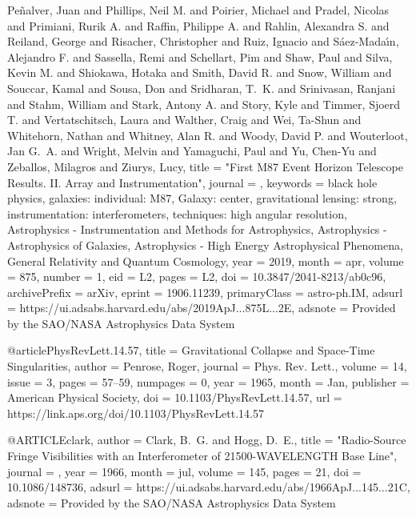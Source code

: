 {{{         {Pe{\~n}alver}, Juan and {Phillips}, Neil M. and {Poirier}, Michael and
         {Pradel}, Nicolas and {Primiani}, Rurik A. and {Raffin}, Philippe A. and
         {Rahlin}, Alexandra S. and {Reiland}, George and
         {Risacher}, Christopher and {Ruiz}, Ignacio and
         {S{\'a}ez-Mada{\'\i}n}, Alejandro F. and {Sassella}, Remi and
         {Schellart}, Pim and {Shaw}, Paul and {Silva}, Kevin M. and
         {Shiokawa}, Hotaka and {Smith}, David R. and {Snow}, William and
         {Souccar}, Kamal and {Sousa}, Don and {Sridharan}, T.~K. and
         {Srinivasan}, Ranjani and {Stahm}, William and {Stark}, Antony A. and
         {Story}, Kyle and {Timmer}, Sjoerd T. and {Vertatschitsch}, Laura and
         {Walther}, Craig and {Wei}, Ta-Shun and {Whitehorn}, Nathan and
         {Whitney}, Alan R. and {Woody}, David P. and {Wouterloot}, Jan G.~A. and
         {Wright}, Melvin and {Yamaguchi}, Paul and {Yu}, Chen-Yu and
         {Zeballos}, Milagros and {Ziurys}, Lucy},
        title = "{First M87 Event Horizon Telescope Results. II. Array and Instrumentation}",
      journal = {\apjl},
     keywords = {black hole physics, galaxies: individual: M87, Galaxy: center, gravitational lensing: strong, instrumentation: interferometers, techniques: high angular resolution, Astrophysics - Instrumentation and Methods for Astrophysics, Astrophysics - Astrophysics of Galaxies, Astrophysics - High Energy Astrophysical Phenomena, General Relativity and Quantum Cosmology},
         year = 2019,
        month = apr,
       volume = {875},
       number = {1},
          eid = {L2},
        pages = {L2},
          doi = {10.3847/2041-8213/ab0c96},
archivePrefix = {arXiv},
       eprint = {1906.11239},
 primaryClass = {astro-ph.IM},
       adsurl = {https://ui.adsabs.harvard.edu/abs/2019ApJ...875L...2E},
      adsnote = {Provided by the SAO/NASA Astrophysics Data System}
}

@article{PhysRevLett.14.57,
  title = {Gravitational Collapse and Space-Time Singularities},
  author = {Penrose, Roger},
  journal = {Phys. Rev. Lett.},
  volume = {14},
  issue = {3},
  pages = {57--59},
  numpages = {0},
  year = {1965},
  month = {Jan},
  publisher = {American Physical Society},
  doi = {10.1103/PhysRevLett.14.57},
  url = {https://link.aps.org/doi/10.1103/PhysRevLett.14.57}
}

@ARTICLE{clark,
       author = {{Clark}, B.~G. and {Hogg}, D.~E.},
        title = "{Radio-Source Fringe Visibilities with an Interferometer of 21500-WAVELENGTH Base Line}",
      journal = {\apj},
         year = 1966,
        month = jul,
       volume = {145},
        pages = {21},
          doi = {10.1086/148736},
       adsurl = {https://ui.adsabs.harvard.edu/abs/1966ApJ...145...21C},
      adsnote = {Provided by the SAO/NASA Astrophysics Data System}
}

}
